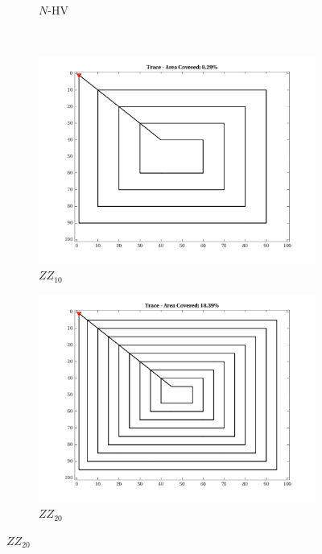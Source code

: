 \begin{figure}[htb!]
\begin{subfigure}[t]{0.25\textwidth}
        \caption{$N$-HV}
    \end{subfigure}%
    \\
    \begin{subfigure}[t]{0.25\textwidth}
        \centering
        \includegraphics[width=\linewidth]{figures/path_zz_10p_100x100_sf_100_seed_2.png}
        \captionsetup{skip=0.20\baselineskip,size=footnotesize}
        \caption{$ZZ_{10}$}
    \end{subfigure}%
    \begin{subfigure}[t]{0.25\textwidth}
        \centering
        \includegraphics[width=\linewidth]{figures/path_zz_20p_100x100_sf_100_seed_2.png}
        \captionsetup{skip=0.20\baselineskip,size=footnotesize}
        \caption{$ZZ_{20}$}

\end{subfigure}
\end{figure}
